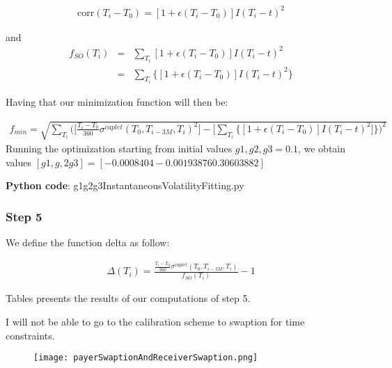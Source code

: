 \documentclass[11pt]{article}
\numberwithin{equation}{subsection}
\begin{document}
\begin{eqnarray*}
	\text{corr}(T_i-T_0) = [1 + \epsilon(T_i-T_0)] I(T_i-t)^2
\end{eqnarray*}

and 
\begin{eqnarray*}
	f_{SO}(T_i) &=& \sum_{T_i} [1 + \epsilon(T_i-T_0)] I(T_i-t)^2 \\ 
	&=& \sum_{T_i} \big\{ [1 + \epsilon(T_i-T_0)] I(T_i-t)^2 \big\} 
\end{eqnarray*}

Having that our minimization function will then be:

\begin{eqnarray*}
	f_{min} = \sqrt{\sum_{T_i}\bigg(\bigg[\frac{T_i-T_0}{360} \sigma^{caplet}(T_0, T_{i-3M}, T_i)^2 \bigg] - \bigg[\sum_{T_i} \big\{ [1 + \epsilon(T_i-T_0)] I(T_i-t)^2 \bigg] \big\}\bigg)^2}
\end{eqnarray*}
Running the optimization starting from initial values \(g1, g2, g3 = 0.1\), we obtain values \([g1, g, 2g3] = [-0.0008404  -0.00193876  0.30603882]\)

\textbf{Python code}: g1g2g3InstantaneousVolatilityFitting.py

\subsubsection*{Step 5}
We define the function delta as follow:

\begin{eqnarray*}
	\Delta (T_i) = \frac{\frac{T_i-T_0}{360} \sigma^{caplet}(T_0, T_{i-3M}, T_i)}{f_{SO}(T_i)}-1
\end{eqnarray*}

Tables presents the results of our computations of step 5.


I will not be able to go to the calibration scheme to swaption for time constraints.


\begin{figure}[H]
	\texttt{[image: payerSwaptionAndReceiverSwaption.png]}
\end{figure}
\end{document}
